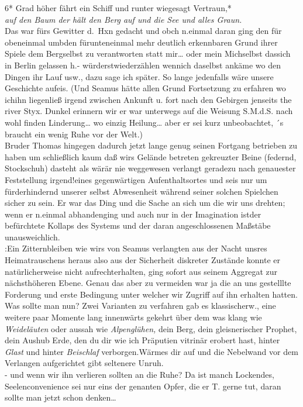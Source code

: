 \documentclass[
]{article}
\begin{document}
6* Grad höher fährt ein Schiff und runter wiegesagt Vertraun,*\\
\emph{auf den Baum der hält den Berg auf und die See und alles Graun.}\\
Das war fürs Gewitter d.~Hxn gedacht und obch n.einmal daran ging den
für obeneinmal umbden fürunteneinmal mehr deutlich erkennbaren Grund
ihrer Spiele dem Bergselbst zu verantworten statt mir\ldots{} oder mein
Michselbst dassich in Berlin gelassen h.- würderstwiederzählen wennich
daselbst ankäme wo den Dingen ihr Lauf usw., dazu sage ich später. So
lange jedenfalls wäre unsere Geschichte aufeis. (Und Seamus hätte allen
Grund Fortsetzung zu erfahren wo ichihn liegenließ irgend zwischen
Ankunft u. fort nach den Gebirgen jenseits the river Styx. Dunkel
erinnern wir er war unterwegs auf die Weisung S.M.d.S. nach wohl finden
Linderung\ldots{} wo einzig Heilung\ldots{} aber er sei kurz
unbeobachtet, ´s braucht ein wenig Ruhe vor der Welt.)\\
Bruder Thomas hingegen dadurch jetzt lange genug seinen Fortgang
betrieben zu haben um schließlich kaum daß wirs Gelände betreten
gekreuzter Beine (federnd, Stockschuh) dasteht als wärär nie weggewesen
verlangt geradezu nach genauester Feststellung irgend!eines
gegenwärtigen Aufenthaltsortes und seis nur um fürderhindernd unserer
selbst Abwesenheit während seiner solchen Spielchen sicher zu sein. Er
war das Ding und die Sache an sich um die wir uns drehten; wenn er
n.einmal abhandenging und auch nur in der Imagination istder befürchtete
Kollaps des Systems und der daran angeschlossenen Maßstäbe
unausweichlich.\\
:Ein Zitternbleiben wie wirs von Seamus verlangten aus der Nacht unsres
Heimatrauschens heraus also aus der Sicherheit diskreter Zustände konnte
er natürlicherweise nicht aufrechterhalten, ging sofort aus seinem
Aggregat zur nächsthöheren Ebene. Genau das aber zu vermeiden war ja die
an uns gestelllte Forderung und erste Bedingung unter welcher wir
Zugriff auf ihn erhalten hatten. Was sollte man nun? Zwei Varianten zu
verfahren gab es klassischerw., eine weitere paar Momente lang
innenwärts gekehrt über dem was klang wie \emph{Weideläuten} oder aussah
wie \emph{Alpenglühen,} dein Berg, dein gleisnerischer Prophet, dein
Aushub Erde, den du dir wie ich Präputien vitrinär erobert hast, hinter
\emph{Glast} und hinter \emph{Beischlaf} verborgen.Wärmes dir auf und
die Nebelwand vor dem Verlangen aufgerichtet gibt seltenere Unruh.\\
- und wenn wir ihn verlieren sollten an die Ruhe? Da ist manch
Lockendes, Seelenconvenience sei nur eins der genanten Opfer, die er T.
gerne tut, daran sollte man jetzt schon denken\ldots{}\\
\end{document}
